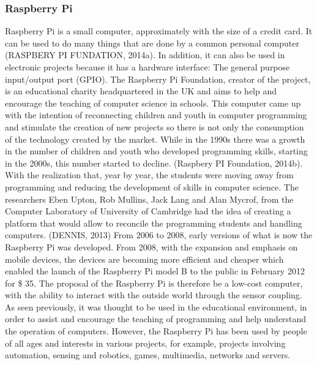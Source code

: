 \documentclass{acm_proc_article-sp}
\begin{document}
\subsubsection{Raspberry Pi}
Raspberry Pi is a small computer, approximately with the size of a credit card. It can be used to do many things that are done by a common personal computer (RASPBERY PI FUNDATION, 2014a). In addition, it can also be used in electronic projects because it has a hardware interface: The general purpose input/output port (GPIO). The Raspberry Pi Foundation, creator of the project, is an educational charity headquartered in the UK and aims to help and encourage the teaching of computer science in schools.
\newline
\newline
This computer came up with the intention of reconnecting children and youth in computer programming and stimulate the creation of new projects so there is not only the consumption of the technology created by the market. While in the 1990s there was a growth in the number of children and youth who developed programming skills, starting in the 2000s, this number started to decline. (Raspbery PI Foundation, 2014b).
\newline
\newline
With the realization that, year by year, the students were moving away from programming and reducing the development of skills in computer science. The researchers Eben Upton, Rob Mullins, Jack Lang and Alan Mycrof, from the Computer Laboratory of University of Cambridge had the idea of creating a platform that would allow to reconcile the programming students  and handling computers. (DENNIS, 2013) From 2006 to 2008, early versions of what is now the Raspberry Pi was developed. From 2008, with the expansion and emphasis on mobile devices, the devices are becoming more efficient and cheaper which enabled the launch of the Raspberry Pi model B to the public in February 2012 for \$ 35.
\newline
\newline
The proposal of the Raspberry Pi is therefore be a low-cost computer, with the ability to interact with the outside world through the sensor coupling. As seen previously, it was thought to be used in the educational environment, in order to assist and encourage the teaching of programming and help understand the operation of computers. However, the Raspberry Pi has been used by people of all ages and interests in various projects, for example, projects involving automation, sensing and robotics, games, multimedia, networks and servers.
\end{document}
